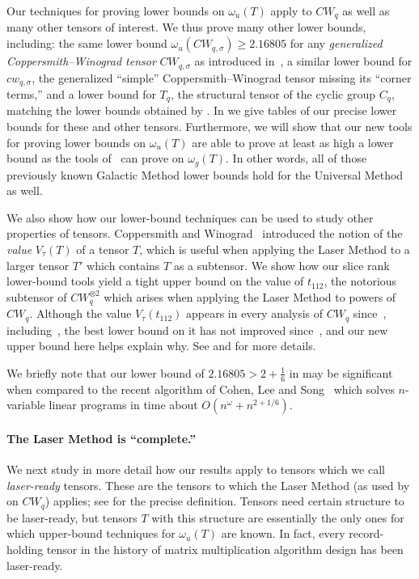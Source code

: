 \documentclass{toc}
\begin{document}
Our techniques for proving lower bounds on $\omega_u(T)$  apply to $CW_q$ as well as many other tensors of interest. We thus prove many other lower bounds, including: the same lower bound $\omega_u(CW_{q,\sigma}) \geq 2.16805$ for any \emph{generalized Coppersmith--Winograd tensor} $CW_{q,\sigma}$ as introduced in~\cite{aw}, a similar lower bound for $cw_{q,\sigma}$, the generalized ``simple'' Coppersmith--Winograd tensor missing its ``corner terms,'' and a lower bound for $T_q$, the structural tensor of the cyclic group $C_q$, matching the lower bounds obtained by \cite{almanitcs, blasiak}.
In  we give tables of our precise lower bounds for these and other tensors.
Furthermore, we will show that our new tools for proving lower bounds on $\omega_u(T)$ are able to prove at least as high a lower bound as the tools of~\cite{aw} can prove on $\omega_g(T)$. In other words, all of those previously known Galactic Method lower bounds hold for the Universal Method as well.

We also show how our lower-bound  %
techniques can be used to study other properties of tensors. Coppersmith and Winograd~\cite{coppersmith} introduced the notion of the \emph{value} $V_\tau(T)$ of a tensor $T$, which is useful when applying the Laser Method to a larger tensor $T'$ which contains $T$ as a subtensor. We show how our slice rank 
%
lower-bound  %
tools yield a tight upper bound on the value of $t_{112}$, the notorious subtensor of $CW_q^{\otimes 2}$ which arises when applying the Laser Method to powers of $CW_q$. Although the value $V_\tau(t_{112})$ appears in every analysis of $CW_q$ since~\cite{coppersmith},
%
including~\cite{stothers,v12,legall,awrefined,legallrect,legallrect2},
the best lower bound on it has not improved since~\cite{coppersmith}, and our new upper bound here helps explain why. See  and  for more details.

We briefly note that our lower bound of $2.16805 > 2 + \frac16$ in  may be significant when compared to the recent algorithm of Cohen, Lee and Song~\cite{cohen2018solving} which solves $n$-variable linear programs in time about $O(n^\omega + n^{2 + 1/6})$.

%
\paragraph{The Laser Method is ``complete.''}


We next study in more detail how our results apply to tensors which we call \emph{laser-ready} tensors. These are the tensors to which the Laser Method (as used by \cite{coppersmith} on $CW_q$) applies; see  for the precise definition. Tensors need certain structure to be laser-ready, but tensors $T$ with this structure are essentially the only ones for which
%
%
upper-bound techniques for  %
 $\omega_u(T)$ are known. In fact, every record-holding tensor in the history of matrix multiplication algorithm design has been laser-ready.
\end{document}
